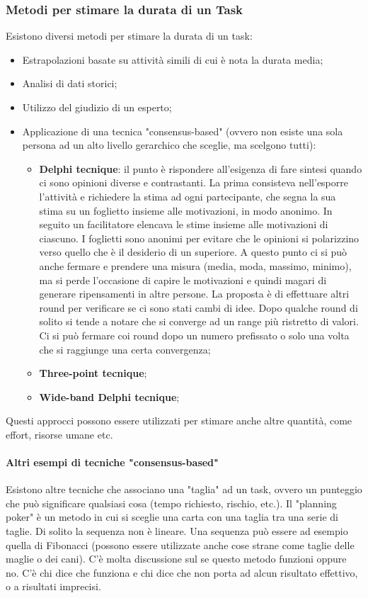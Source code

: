 \subsubsection{Metodi per stimare la durata di un Task}
Esistono diversi metodi per stimare la durata di un task:
\begin{itemize}
	\item Estrapolazioni basate su attività simili di cui è nota la durata media;
	\item Analisi di dati storici;
	\item Utilizzo del giudizio di un esperto;
	\item Applicazione di una tecnica "consensus-based" (ovvero non esiste una sola persona ad un alto livello gerarchico che sceglie, ma scelgono tutti):
	\begin{itemize}
		\item \textbf{Delphi tecnique}: il punto è rispondere all'esigenza di fare sintesi quando ci sono opinioni diverse e contrastanti. La prima consisteva nell'esporre l'attività e richiedere la stima ad ogni partecipante, che segna la sua stima su un foglietto insieme alle motivazioni, in modo anonimo. In seguito un facilitatore elencava le stime insieme alle motivazioni di ciascuno. I foglietti sono anonimi per evitare che le opinioni si polarizzino verso quello che è il desiderio di un superiore. A questo punto ci si può anche fermare e prendere una misura (media, moda, massimo, minimo), ma si perde l'occasione di capire le motivazioni e quindi magari di generare ripensamenti in altre persone. La proposta è di effettuare altri round per verificare se ci sono stati cambi di idee. Dopo qualche round di solito si tende a notare che si converge ad un range più ristretto di valori. Ci si può fermare coi round dopo un numero prefissato o solo una volta che si raggiunge una certa convergenza;
		\item \textbf{Three-point tecnique};
		\item \textbf{Wide-band Delphi tecnique};
	\end{itemize}
\end{itemize}
Questi approcci possono essere utilizzati per stimare anche altre quantità, come effort, risorse umane etc.

\paragraph{Altri esempi di tecniche "consensus-based"}
Esistono altre tecniche che associano una "taglia" ad un task, ovvero un punteggio che può significare qualsiasi cosa (tempo richiesto, rischio, etc.).
Il "planning poker" è un metodo in cui si sceglie una carta con una taglia tra una serie di taglie. Di solito la sequenza non è lineare. Una sequenza può essere ad esempio quella di Fibonacci (possono essere utilizzate anche cose strane come taglie delle maglie o dei cani). C'è molta discussione sul se questo metodo funzioni oppure no. C'è chi dice che funziona e chi dice che non porta ad alcun risultato effettivo, o a risultati imprecisi.

